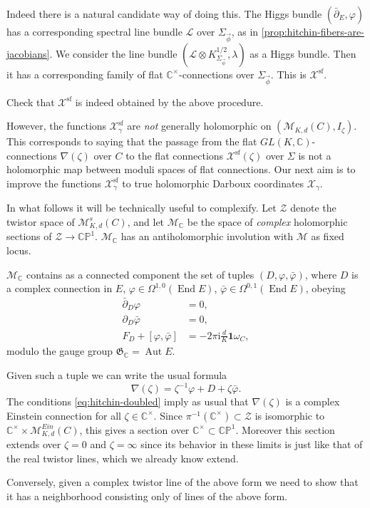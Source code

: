 \documentclass[12pt,letterpaper,reqno]{article}
\numberwithin{equation}{section}
\newcommand{\fG}{{\mathfrak G}}
\newcommand{\cL}{\ensuremath{\mathcal L}}
\newcommand{\cZ}{\ensuremath{\mathcal Z}}
\newcommand{\cM}{\ensuremath{\mathcal M}}
\newcommand{\cX}{\ensuremath{\mathcal X}}
\newcommand{\C}{\ensuremath{\mathbb C}}
\newcommand{\PP}{\ensuremath{\mathbb P}}
\newcommand{\I}{{\mathrm i}}
\newcommand\bid{{\mathbf 1}}
\renewcommand{\sf}{\mathrm{sf}}
\newcommand{\ti}[1]{\textit{#1}}
\DeclareMathOperator{\End}{End}
\DeclareMathOperator{\Aut}{Aut}
\newcommand{\fixme}[1]{{\color{orange}{[#1]}}}
\begin{document}
Indeed there is a natural candidate way of doing this.
The Higgs bundle $(\bar\partial_E,\varphi)$ has a corresponding
spectral line bundle $\cL$ over $\Sigma_{\vec\phi}$, as 
in \autoref{prop:hitchin-fibers-are-jacobians}. We consider
the line bundle $(\cL \otimes K^{1/2}_{\Sigma_{\vec\phi}}, \lambda)$
as a Higgs bundle. Then it has a corresponding family of flat
$\C^\times$-connections over $\Sigma_{\vec\phi}$. This is $\cX^\sf$.

\begin{exercise} Check that $\cX^\sf$ is indeed obtained by the above
procedure.
\end{exercise}

However, the functions $\cX_\gamma^\sf$ are \ti{not} generally holomorphic
on $(\cM_{K,d}(C), I_\zeta)$.
This corresponds to saying that the
passage from the flat $GL(K,\C)$-connections 
$\nabla(\zeta)$ over $C$ to the flat connections
$\cX^\sf(\zeta)$ over $\Sigma$ is not a holomorphic map
between moduli spaces of flat connections.
Our next aim is to improve the functions
$\cX_\gamma^\sf$ to true holomorphic Darboux
coordinates $\cX_\gamma$.

In what follows it will be technically useful to 
complexify.
Let $\cZ$ denote the twistor space of $\cM^s_{K,d}(C)$,
and let $\cM_\C$ be the space of \ti{complex} holomorphic 
sections of $\cZ \to \C\PP^1$. $\cM_\C$ has an antiholomorphic
involution with $\cM$ as fixed locus.

\begin{prop}[Complex twistor lines for $\cM^s_{K,d}(C)$]
$\cM_\C$ contains as a connected component the set of tuples $(D,\varphi,\bar\varphi)$,
where $D$ is a complex connection in $E$,
$\varphi \in \Omega^{1,0}(\End E)$, $\bar\varphi \in \Omega^{0,1}(\End E)$, obeying
\begin{subequations} \label{eq:hitchin-doubled}
\begin{align}
\bar\partial_D \varphi &= 0, \\
\partial_D \bar\varphi &= 0, \\
F_D + [\varphi,\bar\varphi] &=  -2 \pi \I \frac{d}{K} \bid \omega_C,
\end{align}
\end{subequations}
modulo the gauge group $\fG_\C = \Aut E$.
\end{prop}
\begin{pf} Given such a tuple we can write the usual formula
$$ \nabla(\zeta) = \zeta^{-1} \varphi + D + \zeta \bar\varphi. $$
The conditions \eqref{eq:hitchin-doubled} imply
as usual that $\nabla(\zeta)$ is a complex 
Einstein connection for all $\zeta \in \C^\times$.
Since $\pi^{-1}(\C^\times) \subset \cZ$ is isomorphic 
to $\C^\times \times \cM^{Ein}_{K,d}(C)$, this gives a section
over $\C^\times \subset \C\PP^1$. Moreover this section extends
over $\zeta = 0$ and $\zeta = \infty$ since its behavior in these
limits is just like that of the real twistor lines, which we already 
know extend. 

Conversely, given a complex twistor line of the above form we need to show that 
it has a neighborhood consisting only of lines of the above form. \fixme{infinitesimal
calculation using normal bundle}
\end{pf}
\end{document}
